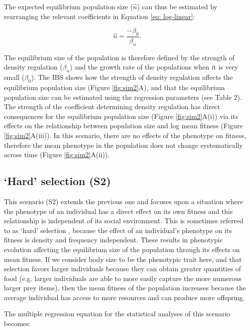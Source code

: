 \documentclass{article}
\begin{document}
	The expected equilibrium population size ($\hat{n}$) can thus be estimated by rearranging the relevant coefficients in Equation \ref{eq: log-linear}:
	
	\begin{equation}\label{eq: eq_N_S1}
	\hat{n}=\frac{-\beta_{0}}{\beta_n}. 
	\end{equation} 
	
	\noindent The equilibrium size of the population is therefore defined by the strength of density regulation ($\beta_n$) and the growth rate of the populations when it is very small ($\beta_0$). The IBS shows how the strength of density regulation affects the equilibrium population size (Figure \ref{fig:sim2}A), and that the equilibrium population size can be estimated using the regression parameters (see Table 2). The strength of the coefficient determining density regulation has direct consequences for the equilibrium population size (Figure \ref{fig:sim2}A(i)) via its effects on the relationship between population size and log mean fitness (Figure \ref{fig:sim2}A(iii)). In this scenario, there are no effects of the phenotype on fitness, therefore the mean phenotype in the population does not change systematically across time (Figure \ref{fig:sim2}A(ii)). 
	
	\subsection{`Hard' selection (S2)}
	This scenario (S2) extends the previous one and focuses upon a situation where the phenotype of an individual has a direct effect on its own fitness and this relationship is independent of its social environment. This is sometimes referred to as `hard' selection \citep{Wallace1975, Bell2021}, because the effect of an individual's phenotype on its fitness is density and frequency independent. These results in phenotypic evolution affecting the equilibrium size of the population through its effects on mean fitness. If we consider body size to be the phenotypic trait here, and that selection favors larger individuals because they can obtain greater quantities of food (e.g. larger individuals are able to more easily capture the more numerous larger prey items), then the mean fitness of the population increases because the average individual has access to more resources and can produce more offspring. 
	
	The multiple regression equation for the statistical analyses of this scenario becomes:
	
\end{document}

